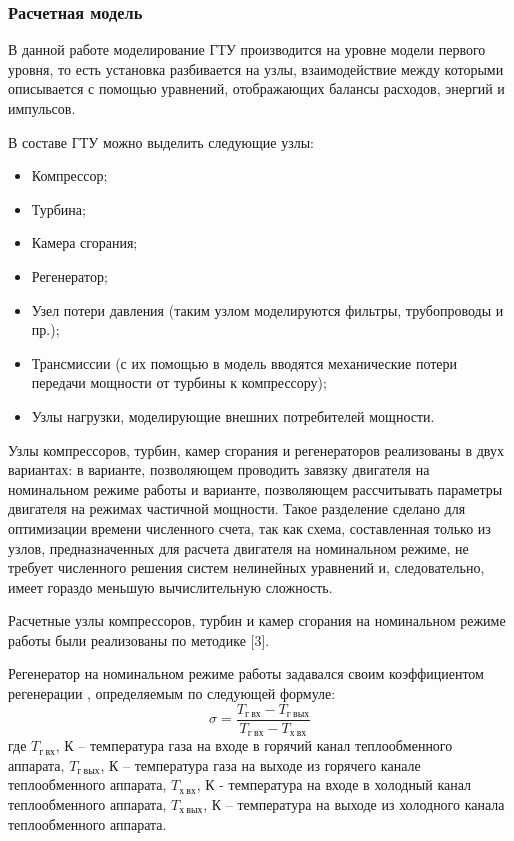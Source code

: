 \subsubsection{Расчетная модель}

В данной работе моделирование ГТУ производится на уровне модели первого уровня, то есть установка разбивается на узлы, взаимодействие между которыми описывается с помощью уравнений, отображающих балансы расходов, энергий и импульсов.

В составе ГТУ можно выделить следующие узлы:
\begin{itemize}
	\item Компрессор;
	\item Турбина;
	\item Камера сгорания;
	\item Регенератор;
	\item Узел потери давления (таким узлом моделируются фильтры, трубопроводы и пр.);
	\item Трансмиссии (с их помощью в модель вводятся механические потери передачи мощности от турбины к компрессору);
	\item Узлы нагрузки, моделирующие внешних потребителей мощности.
\end{itemize}

Узлы компрессоров, турбин, камер сгорания и регенераторов реализованы в двух вариантах: в варианте, позволяющем проводить завязку двигателя на номинальном режиме работы и варианте, позволяющем рассчитывать параметры двигателя на режимах частичной мощности. Такое разделение сделано для оптимизации времени численного счета, так как схема, составленная только из узлов, предназначенных для расчета двигателя на номинальном режиме, не требует численного решения систем нелинейных уравнений и, следовательно, имеет гораздо меньшую вычислительную сложность.

Расчетные узлы компрессоров, турбин и камер сгорания на номинальном режиме работы были реализованы по методике [3].

Регенератор на номинальном режиме работы задавался своим коэффициентом регенерации , определяемым по следующей формуле:
$$
\sigma = \frac{
T_{г \ вх} - T_{г \ вых}
}{
T_{г \ вх} - T_{х \ вх}
}
$$
где $T_{г \ вх}$, К – температура газа на входе в горячий канал теплообменного аппарата, $T_{г \ вых}$, К – температура газа на выходе из горячего канале теплообменного аппарата, $T_{х \ вх}$, К - температура на входе в холодный канал теплообменного аппарата, $T_{х \ вых}$, К – температура на выходе из холодного канала теплообменного аппарата.

